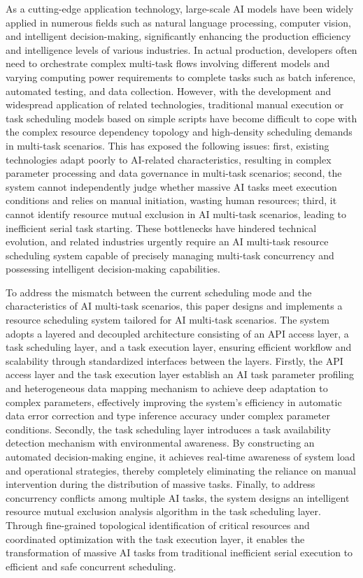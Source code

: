 \begin{abstract*}

As a cutting-edge application technology, large-scale AI models have been widely applied in numerous fields such as natural language processing, computer vision, and intelligent decision-making, significantly enhancing the production efficiency and intelligence levels of various industries. In actual production, developers often need to orchestrate complex multi-task flows involving different models and varying computing power requirements to complete tasks such as batch inference, automated testing, and data collection. However, with the development and widespread application of related technologies, traditional manual execution or task scheduling models based on simple scripts have become difficult to cope with the complex resource dependency topology and high-density scheduling demands in multi-task scenarios. This has exposed the following issues: first, existing technologies adapt poorly to AI-related characteristics, resulting in complex parameter processing and data governance in multi-task scenarios; second, the system cannot independently judge whether massive AI tasks meet execution conditions and relies on manual initiation, wasting human resources; third, it cannot identify resource mutual exclusion in AI multi-task scenarios, leading to inefficient serial task starting. These bottlenecks have hindered technical evolution, and related industries urgently require an AI multi-task resource scheduling system capable of precisely managing multi-task concurrency and possessing intelligent decision-making capabilities.

To address the mismatch between the current scheduling mode and the characteristics of AI multi-task scenarios, this paper designs and implements a resource scheduling system tailored for AI multi-task scenarios. The system adopts a layered and decoupled architecture consisting of an API access layer, a task scheduling layer, and a task execution layer, ensuring efficient workflow and scalability through standardized interfaces between the layers. Firstly, the API access layer and the task execution layer establish an AI task parameter profiling and heterogeneous data mapping mechanism to achieve deep adaptation to complex parameters, effectively improving the system's efficiency in automatic data error correction and type inference accuracy under complex parameter conditions. Secondly, the task scheduling layer introduces a task availability detection mechanism with environmental awareness. By constructing an automated decision-making engine, it achieves real-time awareness of system load and operational strategies, thereby completely eliminating the reliance on manual intervention during the distribution of massive tasks. Finally, to address concurrency conflicts among multiple AI tasks, the system designs an intelligent resource mutual exclusion analysis algorithm in the task scheduling layer. Through fine-grained topological identification of critical resources and coordinated optimization with the task execution layer, it enables the transformation of massive AI tasks from traditional inefficient serial execution to efficient and safe concurrent scheduling.


\end{abstract*}
